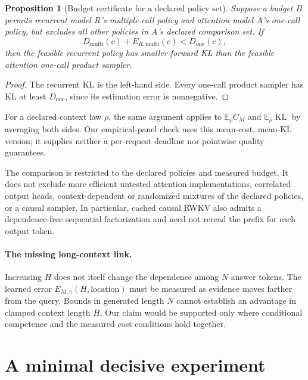 \documentclass{article}
\newtheorem{proposition}{Proposition}
\newcommand{\KL}{\operatorname{KL}}
\begin{document}
\begin{proposition}[Budget certificate for a declared policy set]
Suppose a budget $B$ permits recurrent model $R$'s multiple-call policy and
attention model $A$'s one-call policy, but excludes all other policies in $A$'s
declared comparison set. If
\begin{equation}
 D_{\mathrm{multi}}(c)+E_{R,\mathrm{multi}}(c)<D_{\mathrm{one}}(c),
 \label{eq:certificate}
\end{equation}
then the feasible recurrent policy has smaller forward KL than the feasible
attention one-call product sampler.
\end{proposition}
\begin{proof}
The recurrent KL is the left-hand side. Every one-call product sampler has KL
at least $D_{\mathrm{one}}$, since its estimation error is nonnegative.
\end{proof}
For a declared context law $\rho$, the same argument applies to
$\mathbb E_\rho C_M$ and $\mathbb E_\rho\KL$ by averaging both sides.
Our empirical-panel check uses this mean-cost, mean-KL version; it supplies
neither a per-request deadline nor pointwise quality guarantees.

The comparison is restricted to the declared policies and measured budget. It
does not exclude more efficient untested attention implementations, correlated
output heads, context-dependent or randomized mixtures of the declared
policies, or a causal sampler. In particular, cached causal RWKV also admits
a dependence-free sequential factorization and need not reread the prefix for
each output token.

\paragraph{The missing long-context link.}
Increasing $H$ does not itself change the dependence among $N$ answer tokens.
The learned error $E_{M,\pi}(H,\mathrm{location})$ must be measured as evidence
moves farther from the query. Bounds in generated length $N$ cannot establish
an advantage in clamped context length $H$. Our claim would be supported only
where conditional competence and the measured cost conditions hold together.

\section{A minimal decisive experiment}
\end{document}
